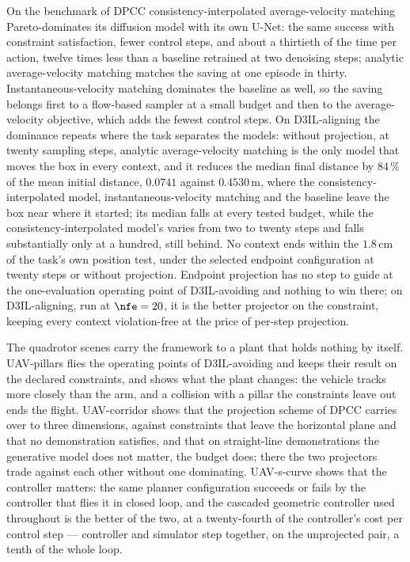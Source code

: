 On the benchmark of \ac{DPCC} consistency-interpolated average-velocity matching Pareto-dominates its
diffusion model with its own U-Net: the same success with constraint satisfaction, fewer control
steps, and about a thirtieth of the time per action, twelve times less than a baseline retrained at
two denoising steps; analytic average-velocity matching matches the saving at one episode in thirty.
Instantaneous-velocity matching dominates the baseline as well, so the saving belongs first to a
flow-based sampler at a small budget and then to the average-velocity objective, which adds the fewest
control steps. On D3IL-aligning the dominance repeats where the task separates the models: without projection, at
twenty sampling steps, analytic average-velocity matching is the only model that moves the box in
every context, and it reduces the median final distance by $84\,\%$ of the mean initial distance,
$0.0741$ against $0.4530$\,m, where the consistency-interpolated model, instantaneous-velocity
matching and the baseline leave the box near where it started; its median falls at every tested
budget, while the consistency-interpolated model's varies from two to twenty steps and falls
substantially only at a hundred, still behind. No context ends within the $1.8$\,cm of the task's own
position test, under the selected endpoint configuration at twenty steps or without projection.
Endpoint projection has no step to guide at the one-evaluation operating point of D3IL-avoiding and
nothing to win there; on D3IL-aligning, run at $\nfe = 20$, it is the better projector on the
constraint, keeping every context violation-free at the price of per-step projection.

The quadrotor scenes carry the framework to a plant that holds nothing by itself. UAV-pillars flies
the operating points of D3IL-avoiding and keeps their result on the declared constraints, and shows
what the plant changes: the vehicle tracks more closely than the arm, and a collision with a pillar the
constraints leave out ends the flight. UAV-corridor shows that the projection scheme of \ac{DPCC}
carries over to three dimensions, against constraints that leave the horizontal plane and that no
demonstration satisfies, and that on straight-line demonstrations the generative model does not
matter, the budget does; there the two projectors trade against each other without one dominating.
UAV-s-curve shows that the controller matters: the same planner configuration succeeds or fails by
the controller that flies it in closed loop, and the cascaded geometric controller used throughout is
the better of the two, at a twenty-fourth of the controller's cost per control step --- controller
and simulator step together, on the unprojected pair, a tenth of the whole loop.

